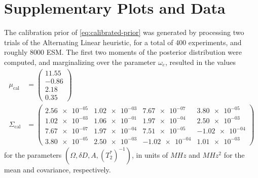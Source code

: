 \documentclass[aps,nofootinbib,twocolumn,superscriptaddress]{revtex4}
\newcommand{\calib}{{\text{cal}}}
\begin{document}






\appendix
\onecolumngrid

\section{Supplementary Plots and Data}
\label{apx:supp-plots-and-data}

The calibration prior of \autoref{eq:calibrated-prior} was generated
by processing two trials of the Alternating Linear heuristic, for 
a total of 400 experiments, and roughly 8000 ESM.
The first two moments of the posterior distribution were computed, 
and marginalizing over the parameter $\omega_e$, resulted in 
the values
\begin{subequations}
\begin{align}
    \mu_\calib&=\begin{pmatrix}
        11.55 \\ -0.86 \\ 2.18 \\ 0.35
    \end{pmatrix} \\
    \Sigma_\calib&=\begin{pmatrix}
        \num{2.56e-05} & \num{1.02e-03} & \num{7.67e-07} & \num{3.80e-05} \\ 
        \num{1.02e-03} & \num{1.06e-01} & \num{1.97e-04} & \num{2.50e-03} \\ 
        \num{7.67e-07} & \num{1.97e-04} & \num{7.51e-05} & \num{-1.02e-04} \\ 
        \num{3.80e-05} & \num{2.50e-03} & \num{-1.02e-04} & \num{1.01e-03}
        \end{pmatrix}
\end{align}
\end{subequations}
for the parameters $(\Omega,\delta D,A,(T_2^*)^{-1})$, in units
of $\si{MHz}$ and $\si{MHz^2}$ for the mean and covariance, respectively.
\end{document}
